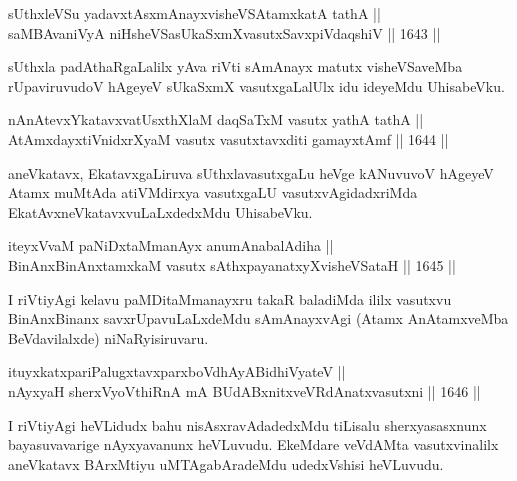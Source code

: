 
\begin{shl}
sUthxleVSu yadavxtAsxmAnayxvisheVSAtamxkatA tathA || \\
saMBAvaniVyA niHsheVSasUkaSxmXvasutxSavxpiVdaqshiV ||  1643 ||  
\end{shl}

\begin{artha}
sUthxla padAthaRgaLalilx yAva riVti sAmAnayx matutx visheVSaveMba rUpaviruvudoV hAgeyeV sUkaSxmX vasutxgaLalUlx idu ideyeMdu UhisabeVku.
\end{artha}


\begin{shl}
nAnAtevxYkatavxvatUsxthXlaM daqSaTxM vasutx yathA tathA ||  \\
AtAmxdayxtiVnidxrXyaM vasutx vasutxtavxditi gamayxtAmf ||  1644 ||  
\end{shl}

\begin{artha}
aneVkatavx, EkatavxgaLiruva sUthxlavasutxgaLu heVge kANuvuvoV hAgeyeV Atamx muMtAda atiVMdirxya vasutxgaLU vasutxvAgidadxriMda EkatAvxneVkatavxvuLaLxdedxMdu UhisabeVku.
\end{artha}


\begin{shl}
iteyxVvaM paNiDxtaMmanAyx anumAnabalAdiha  || \\
BinAnxBinAnxtamxkaM vasutx sAthxpayanatxyXvisheVSataH ||  1645 ||  
\end{shl}

\begin{artha}
I riVtiyAgi kelavu paMDitaMmanayxru takaR baladiMda ililx vasutxvu BinAnxBinanx savxrUpavuLaLxdeMdu sAmAnayxvAgi (Atamx AnAtamxveMba BeVdavilalxde) niNaRyisiruvaru.
\end{artha}


\begin{shl}
ituyxkatxpariPalugxtavxparxboVdhAyABidhiVyateV || \\
nAyxyaH sherxVyoVthiRnA mA BUdABxnitxveVRdAnatxvasutxni ||  1646 ||  
\end{shl}

\begin{artha}
I riVtiyAgi heVLidudx bahu nisAsxravAdadedxMdu tiLisalu sherxyasasxnunx bayasuvavarige nAyxyavanunx heVLuvudu. EkeMdare veVdAMta vasutxvinalilx aneVkatavx BArxMtiyu uMTAgabAradeMdu udedxVshisi heVLuvudu.
\end{artha}


